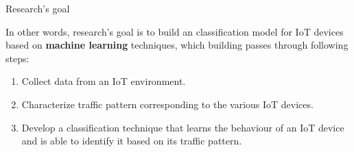 \documentclass[10pt]{beamer}
\begin{document}
\begin{frame}{Research's goal}

In other words, research's goal is to build an classification model for IoT devices based on \textbf{machine learning} techniques, which building passes through following steps:

\begin{enumerate}
\item Collect data from an IoT environment.
\item Characterize traffic pattern corresponding to the various IoT devices.
\item Develop a classification technique that learns the behaviour of an IoT device and is able to identify it based on its traffic pattern.
\end{enumerate}







\end{frame} 
\end{document}
